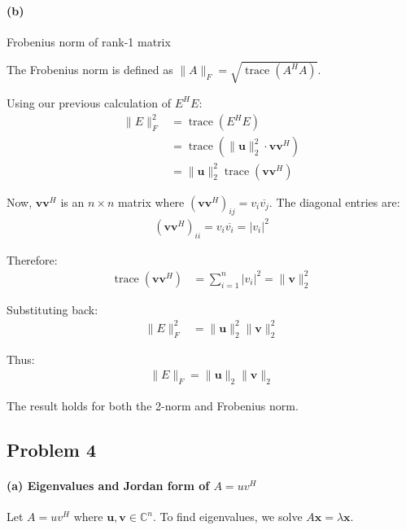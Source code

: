 \paragraph*{(b)} Frobenius norm of rank-1 matrix

The Frobenius norm is defined as $\|A\|_F = \sqrt{\operatorname{trace}(A^H A)}$.

Using our previous calculation of $E^H E$:
\begin{align*}
    \|E\|_F^2 & = \operatorname{trace}(E^H E)                                            \\
              & = \operatorname{trace}(\|\mathbf{u}\|_2^2 \cdot \mathbf{v} \mathbf{v}^H) \\
              & = \|\mathbf{u}\|_2^2 \operatorname{trace}(\mathbf{v} \mathbf{v}^H)
\end{align*}

Now, $\mathbf{v} \mathbf{v}^H$ is an $n \times n$ matrix where $(\mathbf{v} \mathbf{v}^H)_{ij} = v_i \overline{v_j}$. The diagonal entries are:
\begin{align*}
    (\mathbf{v} \mathbf{v}^H)_{ii} = v_i \overline{v_i} = |v_i|^2
\end{align*}

Therefore:
\begin{align*}
    \operatorname{trace}(\mathbf{v} \mathbf{v}^H) & = \sum_{i=1}^n |v_i|^2 = \|\mathbf{v}\|_2^2
\end{align*}

Substituting back:
\begin{align*}
    \|E\|_F^2 & = \|\mathbf{u}\|_2^2 \|\mathbf{v}\|_2^2
\end{align*}

Thus:
\begin{align*}
    \|E\|_F = \|\mathbf{u}\|_2 \|\mathbf{v}\|_2
\end{align*}

The result holds for both the 2-norm and Frobenius norm.

\subsection{Problem 4}

\paragraph*{(a) Eigenvalues and Jordan form of $A = uv^H$}

Let $A = uv^H$ where $\mathbf{u}, \mathbf{v} \in \mathbb{C}^n$. To find eigenvalues, we solve $A\mathbf{x} = \lambda \mathbf{x}$.


